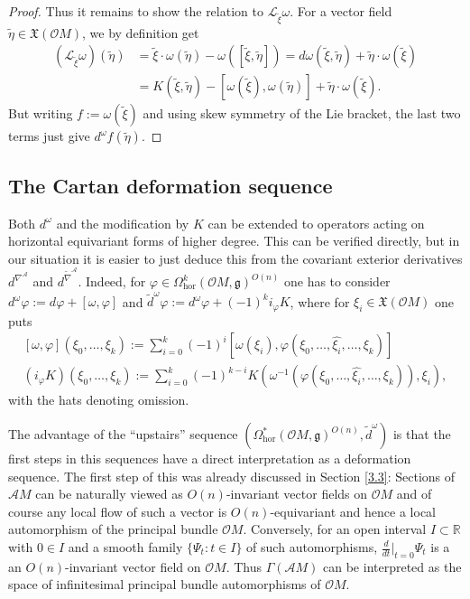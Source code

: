 \documentclass[12pt,a4paper]{amsart}
\def\frak{\mathfrak}
\def\Bbb{\mathbb}
\def\Cal{\mathcal}
\let\phi\varphi
\newcommand{\om}{\omega}
\newcommand{\ph}{\phi}
\newcommand{\Ga}{\Gamma}
\newcommand{\Ps}{\Psi}
\newcommand{\Om}{\Omega}
\newcommand{\tn}{\widetilde{\nabla}}
\newcommand{\hor}{\text{hor}}
\numberwithin{theorem}{section}
\numberwithin{equation}{section}
\theoremstyle{definition}
\theoremstyle{remark}
\begin{document}
\begin{proof}
  Thus it remains to show the relation to $\Cal L_{\tilde\xi}\om$. For a
  vector field $\tilde\eta\in\frak X(\Cal OM)$, we by definition get
  \begin{align*}
(\Cal L_{\tilde\xi}\om)(\tilde\eta)&=\tilde\xi\cdot\om(\tilde\eta)-
    \om([\tilde\xi,\tilde\eta])=d\om(\tilde\xi,\tilde\eta)+
    \tilde\eta\cdot\om(\tilde\xi)\\ &=K(\tilde\xi,\tilde\eta)-
                      [\om(\tilde\xi),\om(\tilde\eta)]+\tilde\eta\cdot\om(\tilde\xi).
  \end{align*}
  But writing $f:=\om(\tilde\xi)$ and using skew symmetry of the Lie bracket, the
  last two terms just give $d^\om f(\tilde\eta)$.
\end{proof}

\subsection{The Cartan deformation sequence}\label{3.4}
Both $d^\om$ and the modification by $K$ can be extended to operators acting on
horizontal equivariant forms of higher degree. This can be verified directly, but in
our situation it is easier to just deduce this from the covariant exterior
derivatives $d^{\nabla^{\Cal A}}$ and $d^{\tn^{\Cal A}}$. Indeed, for
$\ph\in\Om^k_{\hor}(\Cal OM,\frak g)^{O(n)}$ one has to consider
$d^{\om}\ph:=d\ph+[\om,\ph]$ and $\widetilde{d}^{\om}\ph:=d^{\om}\ph+(-1)^ki_\ph K$,
where for $\xi_i\in\frak X(\Cal OM)$ one puts
\begin{gather}\label{br-def}
[\om,\ph](\xi_0,\dots,\xi_k):=\textstyle\sum_{i=0}^k(-1)^i
[\om(\xi_i),\ph(\xi_0,\dots,\widehat{\xi_i},\dots,\xi_k)] \\
\label{iK-def}  (i_\ph K)(\xi_0,\dots,\xi_k):=\textstyle\sum_{i=0}^k(-1)^{k-i}
  K(\om^{-1}(\ph(\xi_0,\dots,\widehat{\xi_i},\dots,\xi_k)),\xi_i), 
\end{gather}
with the hats denoting omission.

The advantage of the ``upstairs'' sequence $(\Om^*_{\hor}(\Cal OM,\frak
g)^{O(n)},\widetilde{d}^\om)$ is that the first steps in this sequences have a direct
interpretation as a deformation sequence. The first step of this was already
discussed in Section \ref{3.3}: Sections of $\Cal AM$ can be naturally viewed as
$O(n)$-invariant vector fields on $\Cal OM$ and of course any local flow of such a
vector is $O(n)$-equivariant and hence a local automorphism of the principal bundle
$\Cal OM$. Conversely, for an open interval $I\subset\Bbb R$ with $0\in I$ and a
smooth family $\{\Ps_t:t\in I\}$ of such automorphisms, $\frac{d}{dt}|_{t=0}\Psi_t$
is a an $O(n)$-invariant vector field on $\Cal OM$. Thus $\Ga(\Cal AM)$ can be
interpreted as the space of infinitesimal principal bundle automorphisms of $\Cal
OM$.
\end{document}
